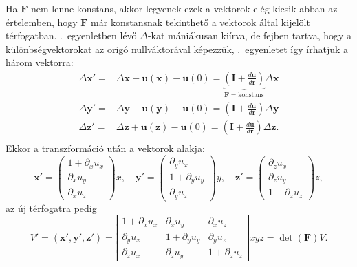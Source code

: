 \documentclass[12pt,a4paper]{scrartcl}
\let\mathbf\bm
\begin{document}
Ha ${\mathbf{F}}$ nem lenne konstans, akkor legyenek ezek a vektorok elég kicsik abban az értelemben, hogy ${\mathbf{F}}$ már konstansnak tekinthető a vektorok által kijelölt térfogatban. .\ egyenletben lévő $\Delta$-kat mániákusan kiírva, de fejben tartva, hogy a különbségvektorokat az origó nullváktorával képezzük, .\ egyenletet így írhatjuk a három vektorra:
\[\begin{aligned}
  \Delta {\mathbf{x}}' =  & \Delta {\mathbf{x}} + {\mathbf{u}}\left( {\mathbf{x}} \right) - {\mathbf{u}}\left( 0 \right) = \underbrace {\left( {{\mathbf{I}} + \frac{{d{\mathbf{u}}}}{{d{\mathbf{r}}}}} \right)}_{{\mathbf{F}} = {\text{konstans}}}\Delta {\mathbf{x}} \\ 
  \Delta {\mathbf{y}}' =  & \Delta {\mathbf{y}} + {\mathbf{u}}\left( {\mathbf{y}} \right) - {\mathbf{u}}\left( 0 \right) = \left( {{\mathbf{I}} + \frac{{d{\mathbf{u}}}}{{d{\mathbf{r}}}}} \right)\Delta {\mathbf{y}} \\ 
  \Delta {\mathbf{z}}' =  & \Delta {\mathbf{z}} + {\mathbf{u}}\left( {\mathbf{z}} \right) - {\mathbf{u}}\left( 0 \right) = \left( {{\mathbf{I}} + \frac{{d{\mathbf{u}}}}{{d{\mathbf{r}}}}} \right)\Delta {\mathbf{z}}. \\ 
\end{aligned} \]
Ekkor a transzformáció után a vektorok alakja:
\[{\mathbf{x}}' = \left( {\begin{array}{*{20}{c}}
  {1 + {\partial _x}{u_x}} \\ 
  {{\partial _x}{u_y}} \\ 
  {{\partial _x}{u_z}} 
\end{array}} \right)x,\quad {\mathbf{y}}' = \left( {\begin{array}{*{20}{c}}
  {{\partial _y}{u_x}} \\ 
  {1 + {\partial _y}{u_y}} \\ 
  {{\partial _y}{u_z}} 
\end{array}} \right)y,\quad {\mathbf{z}}' = \left( {\begin{array}{*{20}{c}}
  {{\partial _z}{u_x}} \\ 
  {{\partial _z}{u_y}} \\ 
  {1 + {\partial _z}{u_z}} 
\end{array}} \right)z,\]
az új térfogatra pedig
\begin{equation*}
  V' = \left( {{\mathbf{x}}',{\mathbf{y}}',{\mathbf{z}}'} \right) = \left| {\begin{array}{*{20}{c}}
  {1 + {\partial _x}{u_x}}&{{\partial _x}{u_y}}&{{\partial _x}{u_z}} \\ 
  {{\partial _y}{u_x}}&{1 + {\partial _y}{u_y}}&{{\partial _y}{u_z}} \\ 
  {{\partial _z}{u_x}}&{{\partial _z}{u_y}}&{1 + {\partial _z}{u_z}} 
\end{array}} \right| x y z  = \det \left( {\mathbf{F}} \right)V. 
\end{equation*}
\end{document}
